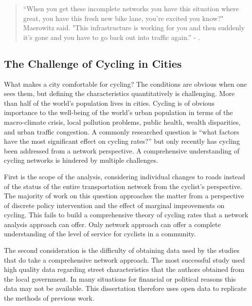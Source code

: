 

\begin{quote}
``When you get these incomplete networks you have this situation where great, you have this fresh new bike lane, you're excited you know?" Maerowitz said. "This infrastructure is working for you and then suddenly it's gone and you have to go back out into traffic again.'' - \cite{juhasz2019}.
\end{quote}
 
\subsection{The Challenge of Cycling in Cities}

What makes a city comfortable for cycling? The conditions are obvious when one sees them, but defining the characteristics quantitatively is challenging. More than half of the world's population lives in cities\parencite{half}. Cycling is of obvious importance to the well-being of the world's  urban population in terms of the macro-climate crisis, local pollution problems,  public health, wealth disparities, and urban traffic congestion. A commonly researched question is ``what factors have the most significant effect on cycling rates?'' but only recently has cycling been addressed from a network perspective. A comprehensive understanding of cycling networks is hindered by multiple challenges. 


First is the scope of the analysis, considering individual changes to roads instead of the status of the entire transportation network from the cyclist's perspective.  The majority of work on this question approaches the matter from a perspective of discrete policy intervention and the effect of marginal improvements on cycling. This fails to build a comprehensive theory of cycling rates that a network analysis approach can offer. Only network approach can offer a complete understanding of the level of service for cyclists in a community. 

The second consideration is the difficulty of obtaining data used by the studies that do take a comprehensive network approach. The most successful study used high quality data regarding street characteristics that the authors obtained from the local government. In many situations for financial or political reasons this data may not be available. This dissertation therefore uses open data to replicate the methods of previous work. 

